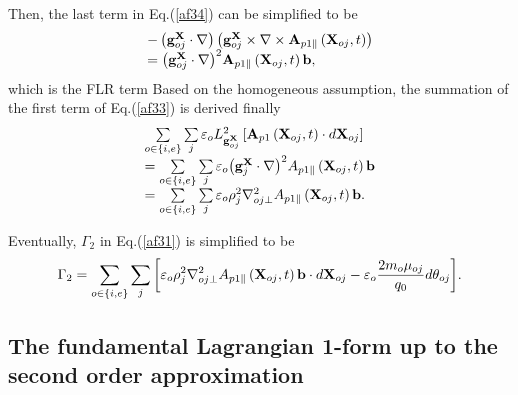 \documentclass[12pt]{iopart}
\begin{document}
Then, the last term in Eq.(\ref{af34}) can be simplified to be
\begin{equation}\label{af36}
\begin{array}{*{20}{l}}
{ - \left( {{\bf{g}}_{oj}^{\bf{X}}\cdot\nabla } \right)\left( {{\bf{g}}_{oj}^{\bf{X}} \times \nabla  \times {{\bf{A}}_{p1\parallel }}\left( {{{\bf{X}}_{oj}},t} \right)} \right)}\\
{ = {{\left( {{\bf{g}}_{oj}^{\bf{X}}\cdot\nabla } \right)}^2}{{\bf{A}}_{p1\parallel }}\left( {{{\bf{X}}_{oj}},t} \right){\bf{b}},}
\end{array}
\end{equation}
which is the FLR term
Based on the homogeneous assumption, the summation of the first term of Eq.(\ref{af33})  is derived finally
\begin{equation}\label{af37}
\begin{array}{l}
\sum\limits_{o \in \{ i,e\} } {\sum\limits_j {{\varepsilon _o}L_{{\bf{g}}_{oj}^{\bf{X}}}^2\left[ {{{\bf{A}}_{p1}}\left( {{{\bf{X}}_{oj}},t} \right)\cdot d{{\bf{X}}_{oj}}} \right]} } \\
 = \sum\limits_{o \in \{ i,e\} } {\sum\limits_j {{\varepsilon _o}{{\left( {{\bf{g}}_j^{\bf{X}}\cdot\nabla } \right)}^2}{A_{p1\parallel }}\left( {{{\bf{X}}_{oj}},t} \right){\bf{b}}} } \\
 = \sum\limits_{o \in \{ i,e\} } {\sum\limits_j {{\varepsilon _o}\rho _j^2\nabla _{oj \bot }^2{A_{p1\parallel }}\left( {{{\bf{X}}_{oj}},t} \right){\bf{b}}} }.
\end{array}
\end{equation}

Eventually, $\Gamma_2$ in Eq.(\ref{af31}) is simplified to be
\begin{equation}\label{af38}
{\Gamma _2} = \sum\limits_{o \in \{ i,e\} } {\sum\limits_j {\left[ {{\varepsilon _o}\rho _j^2\nabla _{oj \bot }^2{A_{p1\parallel }}\left( {{{\bf{X}}_{oj}},t} \right){\bf{b}}\cdot d{{\bf{X}}_{oj}} - {\varepsilon _o}\frac{{2{m_o}{\mu _{oj}}}}{{{q_0}}}d{\theta _{oj}}} \right]} }.
\end{equation}

\subsection{The fundamental Lagrangian 1-form up to the second order approximation}
\end{document}
